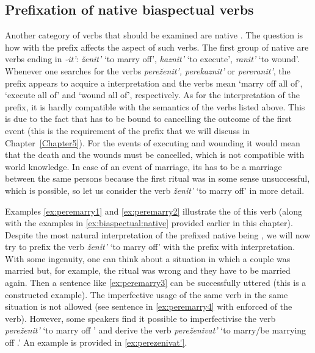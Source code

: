 \subsection{Prefixation of native biaspectual verbs}\label{subsection:perf:native}
Another category of verbs that should be examined are native . The question is how  with the  prefix  affects the aspect of such verbs. The first group of native  are verbs ending in \textit{-it'}: \textit{\v{z}enit'} `to marry off', \textit{kaznit'} `to execute', \textit{ranit'} `to wound'. Whenever one searches for the verbs \textit{pere\v{z}enit', perekaznit'} or \textit{pereranit'}, the prefix  appears to acquire a  interpretation and the verbs mean `marry off all of', `execute all of' and `wound all of', respectively. As for the  interpretation of the prefix, it is hardly compatible with the semantics of the verbs listed above. This is due to the fact that  has to be bound to cancelling the outcome of the first event (this is the requirement of the prefix  that we will discuss in Chapter~\ref{Chapter5}). For the events of executing and wounding it would mean that the death and the wounds must be cancelled, which is not compatible with world knowledge. In case of an event of marriage, its  has to be a marriage between the same persons because the first ritual was in some sense unsuccessful, which is possible, so let us consider the verb \textit{\v{z}enit'} `to marry off' in more detail. 

Examples \ref{ex:peremarry1} and \ref{ex:peremarry2} illustrate the  of this verb (along with the examples in \ref{ex:biaspectual:native} provided earlier in this chapter). Despite the most natural interpretation of the prefixed native  being , we will now try to prefix the verb \textit{\v{z}enit'} `to marry off' with the prefix  with  interpretation. With some ingenuity, one can think about a situation in which a couple was married but, for example, the ritual was wrong and they have to be married again. Then a sentence like \ref{ex:peremarry3} can be successfully uttered (this is a constructed example). The imperfective usage of the same verb in the same situation is not allowed (see sentence in \ref{ex:peremarry4} with enforced  of the verb). However, some speakers find it possible to imperfectivise the verb \textit{pere\v{z}enit'} `to marry off ' and derive the verb \textit{pere\v{z}enivat'} `to marry/be marrying off .' An example is provided in \ref{ex:perezenivat'}. 

